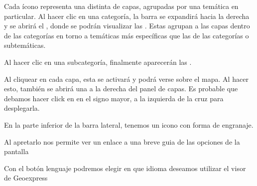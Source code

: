 \documentclass[a4paper,11pt,spanish]{sphinxmanual}
\begin{document}

\sphinxAtStartPar
Cada ícono representa una  distinta de capas, agrupadas por una temática en particular. Al hacer clic en una categoría, la barra se expandirá hacia la derecha y se abrirá el , donde se podrán visualizar las .
Estas agrupan a las capas dentro de las categorías en torno a temáticas más específicas que las de las categorías o sub\sphinxhyphen{}temáticas.

\sphinxAtStartPar
Al hacer clic en una subcategoría, finalmente aparecerán las .


\sphinxAtStartPar
Al cliquear en cada capa, esta se activará y podrá verse sobre el mapa. Al hacer esto, también se abrirá una  a la derecha del panel de capas. Es probable que debamos hacer click en en el signo mayor, a la izquierda de la cruz para desplegarla.


\sphinxAtStartPar
En la parte inferior de la barra lateral, tenemos un icono con forma de engranaje.


\sphinxAtStartPar
Al apretarlo nos permite ver un enlace a una breve guia de las opciones de la pantalla


\sphinxAtStartPar
Con el botón lenguaje podremos elegir en que idioma deseamos utilizar el visor de Geoexpress


\sphinxstepscope
\end{document}
